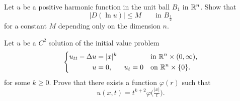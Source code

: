 \begin{problem}
  Let \(u\) be a positive harmonic function in the unit ball \(B_1\) in
  \(\mathbb{R}^n\). Show that
  \[
    \bigl|D(\ln u)\bigr|\leq M\qquad \text{in \(B_{\frac{1}{2}}\)}
  \]
  for a constant \(M\) depending only on the dimension \(n\).

\end{problem}
\begin{solution*}
\end{solution*}

\begin{problem}
  Let \(u\) be a \(C^2\) solution of the initial value problem
  \[
    \left\{
    \begin{aligned}
      u_{tt}-\Delta u&=|x|^k&&&&\text{in \(\mathbb{R}^n\times(0,\infty)\),}\\
      u&=0,&u_t&=0&&\text{on \(\mathbb{R}^n\times\{0\}\)}.
    \end{aligned}
    \right.
  \]
  for some \(k\geq 0\). Prove that there exists a function \(\varphi(r)\)
  such that
  \[
    u(x,t)=t^{k+2}\varphi\bigl(\tfrac{|x|}{t}\bigr).
  \]

  \noindent [\emph{Hint:} As one of the steps show that \(u\) is
  \((k+2)\)-homogeneous in \((x,t)\) variables, i.e.,
  \(u(\lambda x,\lambda t)=\lambda^{k+2}u(x,t)\) for any \(\lambda >0\).]
\end{problem}
\begin{solution*}
\end{solution*}

